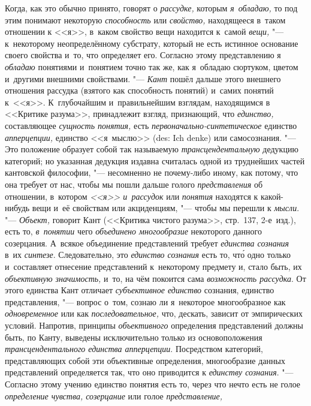 Когда, как это обычно принято, говорят о {\em рассудке,} которым
{\em я~обладаю,} то под этим понимают некоторую {\em способность} или
{\em свойство,} находящееся в~таком отношении к <<я>>, в~каком свойство вещи
находится к~самой {\em вещи,} "--- к~некоторому неопределённому субстрату,
который не есть истинное основание
своего свойства и~то, что определяет его. Согласно этому представлению я
{\em обладаю} понятиями и~понятием точно так же, как я~обладаю сюртуком,
цветом и~другими внешними свойствами. "--- {\em Кант} пошёл дальше этого
внешнего отношения рассудка (взятого как способность понятий) и~самих
понятий к~<<я>>. К~глубочайшим и~правильнейшим взглядам, находящимся в
<<Критике разума>>, принадлежит взгляд, признающий, что {\em единство,}
составляющее {\em сущность понятия,} есть {\em первоначально-синтетическое}
единство {\em апперцепции,} единство <<я~мыслю>> (des: Ich denke) или
самосознания. "---
Это положение образует собой так называемую {\em трансцендентальную} дедукцию
категорий; но указанная дедукция издавна считалась одной из труднейших
частей кантовской философии, "--- несомненно не почему-либо иному, как потому,
что она требует от нас, чтобы мы пошли дальше голого {\em представления} об
отношении, в~котором {\em <<я>> и~рассудок} или {\em понятия} находятся к
какой-нибудь вещи и~её свойствам или акциденциям, "--- чтобы мы перешли к
{\em мысли}. "--- {\em Объект,} говорит Кант (<<Критика чистого разума>>,
стр.~137, 2-е~изд.), есть то, {\em в~понятии} чего {\em объединено многообразие}
некоторого данного созерцания. А~всякое объединение представлений требует
{\em единства сознания} в~их {\em синтезе}. Следовательно, это {\em единство сознания}
есть то, чт\'{о} одно только и~составляет отнесение представлений к~некоторому
предмету и, стало быть, их {\em объективную значимость,} и~то, на чём покоится
сама {\em возможность рассудка}. От этого единства Кант отличает
{\em субъективное единство} сознания, единство представления, "--- вопрос о~том,
сознаю ли я~некоторое многообразное как {\em одновременное} или как
{\em последовательное,} что, дескать, зависит от эмпирических условий.
Напротив, принципы {\em объективного} определения представлений должны быть,
по Канту, выведены исключительно только из основоположения
{\em трансцендентального единства апперцепции}. Посредством категорий,
представляющих собой эти объективные определения, многообразие данных
представлений определяется так, что оно приводится к {\em единству сознания}.
"--- Согласно этому учению единство понятия есть то, через что нечто есть не
голое {\em определение чувства, созерцание} или голое {\em представление,}
